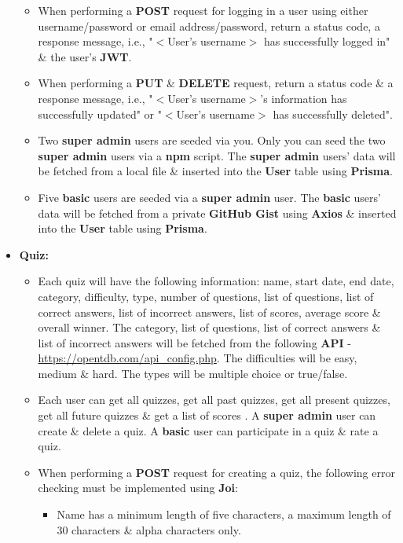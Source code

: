 \documentclass{article}
\begin{document}
\begin{itemize}
\begin{itemize}
		\item When performing a \textbf{POST} request for logging in a user using either username/password or email address/password, return a status code, a response message, i.e., "$<$User's username$>$ has successfully logged in" \& the user's \textbf{JWT}.
		\item When performing a \textbf{PUT} \& \textbf{DELETE} request, return a status code \& a response message, i.e., "$<$User's username$>$'s information has successfully updated" or "$<$User's username$>$ has successfully deleted".
		\item Two \textbf{super admin} users are seeded via you. Only you can seed the two \textbf{super admin} users via a \textbf{npm} script. The \textbf{super admin} users' data will be fetched from a local file \& inserted into the \textbf{User} table using \textbf{Prisma}.  
		\item Five \textbf{basic} users are seeded via a \textbf{super admin} user. The \textbf{basic} users' data will be fetched from a private \textbf{GitHub Gist} using \textbf{Axios} \& inserted into the \textbf{User} table using \textbf{Prisma}. 
	\end{itemize} 
	\item \textbf{Quiz:}
	\begin{itemize}
		\item Each quiz will have the following information: name, start date, end date, category, difficulty, type, number of questions, list of questions, list of correct answers, list of incorrect answers, list of scores, average score \& overall winner. The category, list of questions, list of correct answers \& list of incorrect answers will be fetched from the following \textbf{API} - \href{https://opentdb.com/api\_config.php}{https://opentdb.com/api\_config.php}. The difficulties will be easy, medium \& hard. The types will be multiple choice or true/false.
		\item Each user can get all quizzes, get all past quizzes, get all present quizzes, get all future quizzes \& get a list of scores . A \textbf{super admin} user can create \& delete a quiz. A \textbf{basic} user can participate in a quiz \& rate a quiz.
		\item When performing a \textbf{POST} request for creating a quiz, the following error checking must be implemented using \textbf{Joi}:
		\begin{itemize}
			\item Name has a minimum length of five characters, a maximum length of 30 characters \& alpha characters only.

\end{itemize}
\end{itemize}
\end{itemize}
\end{document}
